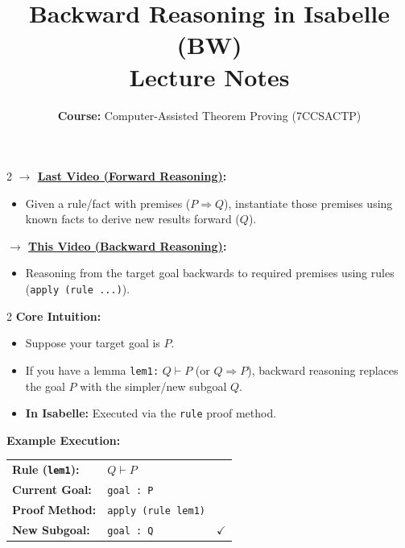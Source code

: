 \documentclass[10pt,a4paper]{article}
\title{\textbf{\huge Backward Reasoning in Isabelle (BW)}\\[0.3em]
\large Lecture Notes}
\author{\textbf{Course:} Computer-Assisted Theorem Proving (7CCSACTP)}
\date{}
\begin{document}
\maketitle
\vspace{-1.5em}

\begin{tcolorbox}[title={1. Context \& Comparison with Forward Reasoning}]
\begin{multicols}{2}
\textbf{$\rightarrow$ \underline{Last Video (Forward Reasoning)}:}
\begin{itemize}[leftmargin=1.2em, itemsep=2pt]
    \item Given a rule/fact with premises ($P \Longrightarrow Q$), instantiate those premises using known facts to derive new results forward ($Q$).
\end{itemize}

\columnbreak

\textbf{$\rightarrow$ \underline{This Video (Backward Reasoning)}:}
\begin{itemize}[leftmargin=1.2em, itemsep=2pt]
    \item Reasoning from the target goal backwards to required premises using rules (\texttt{apply (rule ...)}).
\end{itemize}
\end{multicols}
\end{tcolorbox}

\vspace{0.3em}

\begin{tcolorbox}[title={2. Intuition \& Mechanics of Backward Reasoning}]
\begin{multicols}{2}
\textbf{Core Intuition:}
\begin{itemize}[leftmargin=1.2em, itemsep=3pt]
    \item Suppose your target goal is $P$.
    \item If you have a lemma \texttt{lem1:} $Q \vdash P$ (or $Q \Longrightarrow P$), backward reasoning replaces the goal $P$ with the simpler/new subgoal $Q$.
    \item \textbf{In Isabelle:} Executed via the \texttt{rule} proof method.
\end{itemize}

\columnbreak

\textbf{Example Execution:}
\begin{center}
\begin{tabular}{lll}
\textbf{Rule (\texttt{lem1}):} & $Q \vdash P$ & \\
\textbf{Current Goal:} & \texttt{goal : P} & \\
\textbf{Proof Method:} & \texttt{apply (rule lem1)} & \\
\textbf{New Subgoal:} & \texttt{goal : Q} & $\checkmark$
\end{tabular}
\end{center}
\end{multicols}
\end{tcolorbox}
\end{document}
